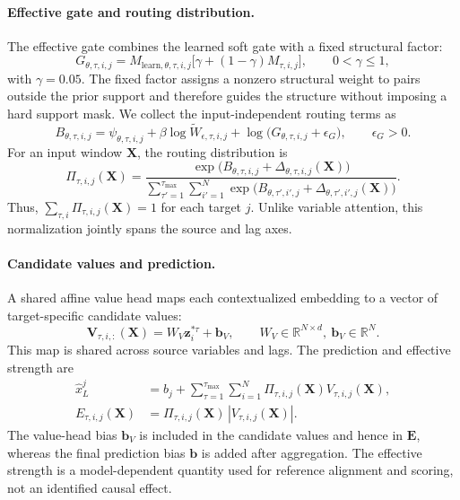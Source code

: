 \documentclass[letterpaper]{article}
\newcommand{\Wts}{\widetilde{W}}
\begin{document}
\paragraph{Effective gate and routing distribution.}
The effective gate combines the learned soft gate with a fixed structural factor:
\begin{equation}
G_{\theta,\tau,i,j}=M_{\mathrm{learn},\theta,\tau,i,j}\bigl[\gamma+(1-\gamma)M_{\tau,i,j}\bigr],\qquad 0<\gamma\le1,
\tag{A.14}
\end{equation}
with $\gamma=0.05$. The fixed factor assigns a nonzero structural weight to pairs outside the prior support and therefore guides the structure without imposing a hard support mask. We collect the input-independent routing terms as
\begin{equation}
B_{\theta,\tau,i,j}=\psi_{\theta,\tau,i,j}+\beta\log\Wts_{\epsilon,\tau,i,j}+\log\bigl(G_{\theta,\tau,i,j}+\epsilon_G\bigr),\qquad \epsilon_G>0.
\tag{A.15}
\end{equation}
For an input window $\mathbf{X}$, the routing distribution is
\begin{equation}
\Pi_{\tau,i,j}(\mathbf{X})=\frac{\exp\bigl(B_{\theta,\tau,i,j}+\Delta_{\theta,\tau,i,j}(\mathbf{X})\bigr)}{\sum_{\tau'=1}^{\tau_{\max}}\sum_{i'=1}^{N}\exp\bigl(B_{\theta,\tau',i',j}+\Delta_{\theta,\tau',i',j}(\mathbf{X})\bigr)}.
\tag{A.16}
\end{equation}
Thus, $\sum_{\tau,i}\Pi_{\tau,i,j}(\mathbf{X})=1$ for each target $j$. Unlike variable attention, this normalization jointly spans the source and lag axes.

\paragraph{Candidate values and prediction.}
A shared affine value head maps each contextualized embedding to a vector of target-specific candidate values:
\begin{equation}
\mathbf{V}_{\tau,i,:}(\mathbf{X})=W_V\mathbf{z}^{*\tau}_i+\mathbf{b}_V,\qquad W_V\in\mathbb{R}^{N\times d},\ \mathbf{b}_V\in\mathbb{R}^N.
\tag{A.17}
\end{equation}
This map is shared across source variables and lags. The prediction and effective strength are
\begin{align}
\hat{x}^j_L&=b_j+\sum_{\tau=1}^{\tau_{\max}}\sum_{i=1}^{N}\Pi_{\tau,i,j}(\mathbf{X})V_{\tau,i,j}(\mathbf{X}), \tag{A.18}\\
E_{\tau,i,j}(\mathbf{X})&=\Pi_{\tau,i,j}(\mathbf{X})\,|V_{\tau,i,j}(\mathbf{X})|. \tag{A.19}
\end{align}
The value-head bias $\mathbf{b}_V$ is included in the candidate values and hence in $\mathbf{E}$, whereas the final prediction bias $\mathbf{b}$ is added after aggregation. The effective strength is a model-dependent quantity used for reference alignment and scoring, not an identified causal effect.
\end{document}
